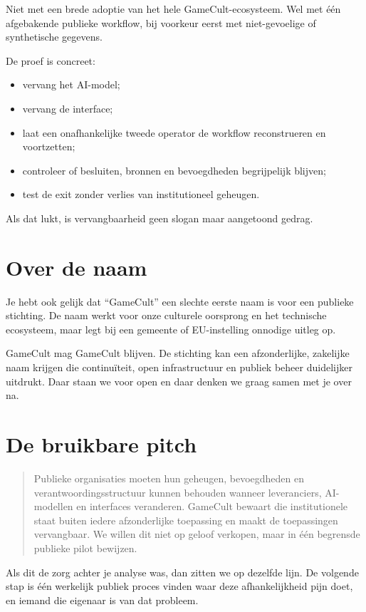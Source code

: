 \documentclass[10pt,a4paper]{article}
\begin{document}
Niet met een brede adoptie van het hele GameCult-ecosysteem. Wel met één afgebakende publieke workflow, bij voorkeur eerst met niet-gevoelige of synthetische gegevens.

De proef is concreet:

\begin{itemize}
  \item vervang het AI-model;
  \item vervang de interface;
  \item laat een onafhankelijke tweede operator de workflow reconstrueren en voortzetten;
  \item controleer of besluiten, bronnen en bevoegdheden begrijpelijk blijven;
  \item test de exit zonder verlies van institutioneel geheugen.
\end{itemize}

Als dat lukt, is vervangbaarheid geen slogan maar aangetoond gedrag.

\section{Over de naam}

Je hebt ook gelijk dat ``GameCult'' een slechte eerste naam is voor een publieke stichting. De naam werkt voor onze culturele oorsprong en het technische ecosysteem, maar legt bij een gemeente of EU-instelling onnodige uitleg op.

GameCult mag GameCult blijven. De stichting kan een afzonderlijke, zakelijke naam krijgen die continuïteit, open infrastructuur en publiek beheer duidelijker uitdrukt. Daar staan we voor open en daar denken we graag samen met je over na.

\section{De bruikbare pitch}

\begin{quote}
Publieke organisaties moeten hun geheugen, bevoegdheden en verantwoordingsstructuur kunnen behouden wanneer leveranciers, AI-modellen en interfaces veranderen. GameCult bewaart die institutionele staat buiten iedere afzonderlijke toepassing en maakt de toepassingen vervangbaar. We willen dit niet op geloof verkopen, maar in één begrensde publieke pilot bewijzen.
\end{quote}

Als dit de zorg achter je analyse was, dan zitten we op dezelfde lijn. De volgende stap is één werkelijk publiek proces vinden waar deze afhankelijkheid pijn doet, en iemand die eigenaar is van dat probleem.
\end{document}
